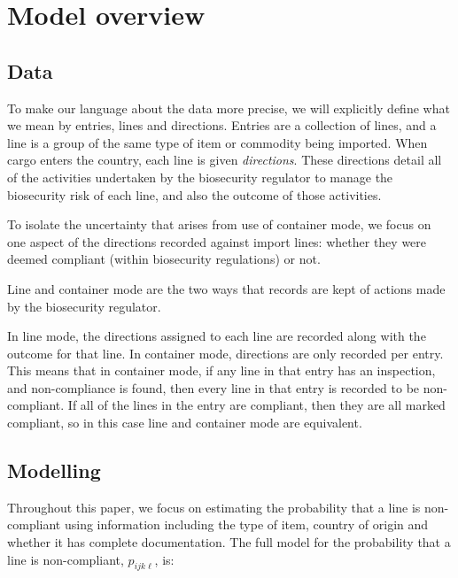 \documentclass[useAMS,usenatbib,referee]{biom}
\newif\ifproofread
\newcommand{\rev}[1]{%
\ifproofread
\hl{#1}%
\else
#1%
\fi
}
\begin{document}
\section{Model overview}
\subsection{Data}\label{sec:data}

To make our language about the data more precise, we will explicitly define what we mean by entries, lines and directions. Entries are a collection of lines, and a line is a group of the same type of item or commodity being imported. When cargo enters the country, each line is given \emph{directions}. These directions detail all of the activities undertaken by the biosecurity regulator to manage the biosecurity risk of each line, and also the outcome of those activities. \rev{To isolate the uncertainty that arises from use of container mode, we focus on one aspect of the directions recorded against import lines: whether they were deemed compliant (within biosecurity regulations) or not.}

\rev{Line and container mode are the two ways that records are kept of actions made by the biosecurity regulator.} In line mode, the directions assigned to each line are recorded along with the outcome for that line. In container mode, directions are only recorded per entry. This means that in container mode, if any line in that entry has an inspection, and non-compliance is found, then every line in that entry is recorded to be non-compliant. If all of the lines in the entry are compliant, then they are all marked compliant, so in this case line and container mode are equivalent.

\subsection{Modelling}\label{sec:model}

Throughout this paper, we focus on estimating the probability that a line is non-compliant using information including the type of item, country of origin and whether it has complete documentation. The full model for the probability that a line is non-compliant, \(p_{ijk\ell}\), is: 
\end{document}

